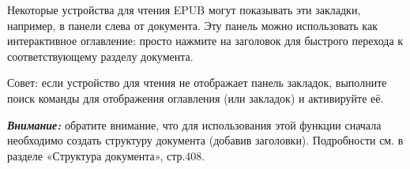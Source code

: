 ﻿\documentclass[a4paper,10pt]{article}
\begin{document}
\begin{itemize}
Некоторые устройства для чтения EPUB могут показывать эти закладки, например, в панели слева от документа. Эту панель можно использовать как интерактивное оглавление: просто нажмите на заголовок для быстрого перехода к соответствующему разделу документа.

Совет: если устройство для чтения не отображает панель закладок, выполните поиск команды для отображения оглавления (или закладок) и активируйте её.
 
\begin{mdframed}[backgroundcolor=blue!10]
\textbf{\textit{Внимание:}} обратите внимание, что для использования этой функции сначала необходимо создать структуру документа (добавив заголовки). Подробности см. в разделе «Структура документа», стр.408.
\end{mdframed} 
 \end{itemize}
 
\end{document}

